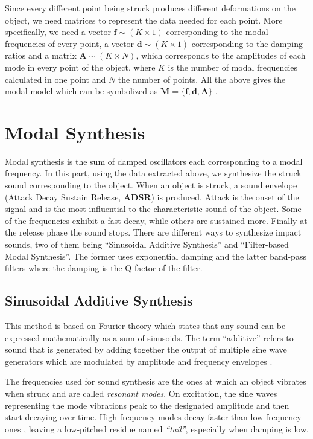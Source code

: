 Since every different point being struck produces different deformations on the object, we need matrices to represent the data needed for each point. More specifically, we need a vector $\textbf{f}\sim (K \times 1)$  corresponding to the modal frequencies of every point, a vector $\textbf{d}\sim (K \times 1)$ corresponding to the damping ratios and a matrix $\textbf{A}\sim (K \times N)$, which corresponds to the amplitudes of each mode in every point of the object, where $K$ is the number of modal frequencies calculated in one point and $N$ the number of points. All the above gives the modal model which can be symbolized as $\textbf{M} = \{\textbf{f}, \textbf{d}, \textbf{A}\}$ \cite{van2001foleyautomatic}.
 
\section{Modal Synthesis}\label{sec:modal_synth}
Modal synthesis is the sum of damped oscillators each corresponding to a modal frequency. In this part, using the data extracted above, we synthesize the struck sound corresponding to the object. When an object is struck, a sound envelope (Attack Decay Sustain Release, \textbf{ADSR}) is produced. Attack is the onset of the signal and is the most influential to the characteristic sound of the object. Some of the frequencies exhibit a fast decay, while others are sustained more.  Finally at the release phase the sound stops. There are different ways to synthesize impact sounds, two of them being ``Sinusoidal Additive Synthesis'' and ``Filter-based Modal Synthesis''. The former uses exponential damping and the latter band-pass filters where the damping is the Q-factor of the filter. 

\subsection{Sinusoidal Additive Synthesis}\label{sec:sin_synth}

This method is based on Fourier theory which states that any sound can be expressed mathematically as a sum of sinusoids. The term ``additive'' refers to sound that is generated by adding together the output of multiple sine wave generators which are modulated by amplitude and frequency envelopes \cite{smith2011spectral}.

The frequencies used for sound synthesis are the ones at which an object vibrates when struck and are called \textit{resonant modes}. On excitation, the sine waves representing the mode vibrations peak to the designated amplitude and then start decaying over time. High frequency modes decay faster than low frequency ones \cite{lloyd2011sound}, leaving a low-pitched residue named \textit{``tail''}, especially when damping is low.

